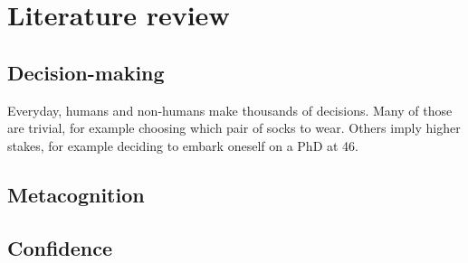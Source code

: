 \chapter{Literature review}

\section{Decision-making}

Everyday, humans and non-humans make thousands of \glspl{decision}. Many of those are trivial, for example choosing which pair of socks to wear. Others imply higher stakes, for example deciding to embark oneself on a PhD at 46.

\section{Metacognition}

\section{Confidence}